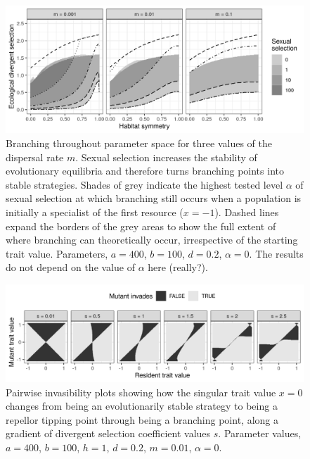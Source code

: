 \begin{figure}
    \centering
    \includegraphics[width=\textwidth]{figures/map_branching_points}
    \caption{Branching throughout parameter space for three values of the dispersal rate $m$. Sexual selection increases the stability of evolutionary equilibria and therefore turns branching points into stable strategies. Shades of grey indicate the highest tested level $\alpha$ of sexual selection at which branching still occurs when a population is initially a specialist of the first resource ($x = -1$). Dashed lines expand the borders of the grey areas to show the full extent of where branching can theoretically occur, irrespective of the starting trait value. Parameters, $a = 400$, $b = 100$, $d = 0.2$, $\alpha = 0$. The results do not depend on the value of $\alpha$ here (really?).}
    \label{fig:map_branching_points}
\end{figure}

\begin{figure}
    \centering
    \includegraphics[width=\textwidth]{figures/pairwise_invasibility_plots_test_s}
    \caption{Pairwise invasibility plots showing how the singular trait value $x = 0$ changes from being an evolutionarily stable strategy to being a repellor tipping point through being a branching point, along a gradient of divergent selection coefficient values $s$. Parameter values, $a = 400$, $b = 100$, $h = 1$, $d = 0.2$, $m = 0.01$, $\alpha = 0$.}
    \label{fig:pairwise_invasibility_s}
\end{figure}

